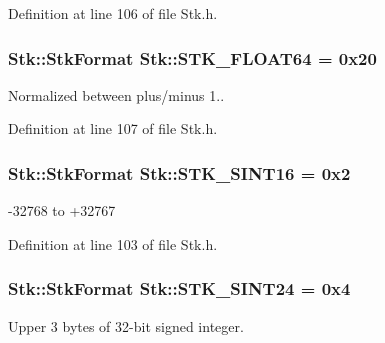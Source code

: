 Definition at line 106 of file Stk.\+h.

\subsubsection[{\texorpdfstring{S\+T\+K\+\_\+\+F\+L\+O\+A\+T64}{STK_FLOAT64}}]{ {\bf Stk\+::\+Stk\+Format} Stk\+::\+S\+T\+K\+\_\+\+F\+L\+O\+A\+T64 = 0x20\hspace{0.3cm}{\ttfamily [static]}}\hypertarget{class_nyq_1_1_stk_a7c6c1932fcab4d5adacd9ae4c3d36054}{}\label{class_nyq_1_1_stk_a7c6c1932fcab4d5adacd9ae4c3d36054}
Normalized between plus/minus 1.. 

Definition at line 107 of file Stk.\+h.

\subsubsection[{\texorpdfstring{S\+T\+K\+\_\+\+S\+I\+N\+T16}{STK_SINT16}}]{ {\bf Stk\+::\+Stk\+Format} Stk\+::\+S\+T\+K\+\_\+\+S\+I\+N\+T16 = 0x2\hspace{0.3cm}{\ttfamily [static]}}\hypertarget{class_nyq_1_1_stk_a74923e12da75c2b13fac753ae381fbe3}{}\label{class_nyq_1_1_stk_a74923e12da75c2b13fac753ae381fbe3}
-\/32768 to +32767 

Definition at line 103 of file Stk.\+h.

\subsubsection[{\texorpdfstring{S\+T\+K\+\_\+\+S\+I\+N\+T24}{STK_SINT24}}]{ {\bf Stk\+::\+Stk\+Format} Stk\+::\+S\+T\+K\+\_\+\+S\+I\+N\+T24 = 0x4\hspace{0.3cm}{\ttfamily [static]}}\hypertarget{class_nyq_1_1_stk_a02d5a1c8e8d98868a158053727ef4315}{}\label{class_nyq_1_1_stk_a02d5a1c8e8d98868a158053727ef4315}
Upper 3 bytes of 32-\/bit signed integer. 

